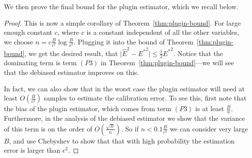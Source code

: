 We then prove the final bound for the plugin estimator, which we recall below.

\finalPlugin*

\begin{proof}
This is now a simple corollary of Theorem~\ref{thm:plugin-bound}. For large enough constant $c$, where $c$ is a constant independent of all the other variables, we choose $n = c\frac{B}{\epsilon^2} \log{\frac{B}{\epsilon^2}}$. Plugging it into the bound of Theorem~\ref{thm:plugin-bound}, we get the desired result, that $\lvert \hat{E}^2 - {E^*}^2 \rvert \leq \frac{1}{2}{E^*}^2$. Notice that the dominating term is term $(P3)$ in Theorem~\ref{thm:plugin-bound}---we will see that the debiased estimator improves on this.

In fact, we can also show that in the worst case the plugin estimator will need at least $O(\frac{B}{\epsilon^2})$ samples to estimate the calibration error. To see this, first note that the bias of the plugin estimator, which comes from term $(P3)$ is at least $\frac{B}{n}$. Furthermore, in the analysis of the debiased estimator we show that the variance of this term is on the order of $O(\frac{\sqrt{B}}{n})$. So if $n < 0.1\frac{B}{\epsilon^2}$ we can consider very large $B$, and use Chebyshev to show that that with high probability the estimation error is larger than $\epsilon^2$. 




\end{proof}
